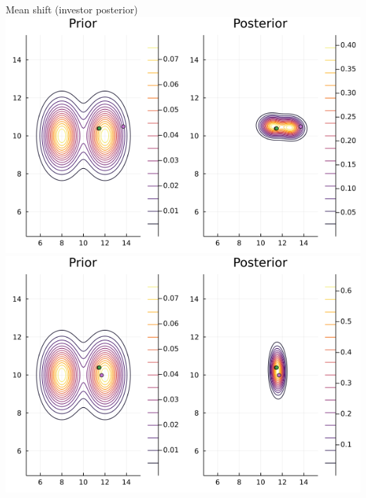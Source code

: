 \documentclass[
  ignorenonframetext,
]{beamer}
\begin{document}
\begin{frame}{Mean shift (investor posterior)}
\protect\hypertarget{mean-shift-investor-posterior}{}
\includegraphics[width=0.4\paperwidth]{complexity_files/figure-beamer/unnamed-chunk-13-1}
\includegraphics[width=0.4\paperwidth]{complexity_files/figure-beamer/unnamed-chunk-13-2}
\end{frame}
\end{document}
